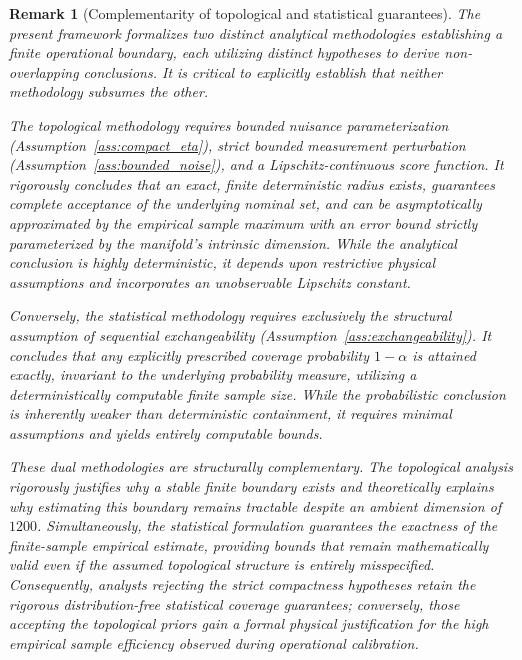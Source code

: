\documentclass[a4paper]{cas-sc}
\newtheorem{remark}{Remark}
\begin{document}
\begin{remark}[Complementarity of topological and statistical guarantees]
\label{rem:topology_vs_statistics}
The present framework formalizes two distinct analytical methodologies establishing a finite operational boundary, each utilizing distinct hypotheses to derive non-overlapping conclusions. It is critical to explicitly establish that neither methodology subsumes the other.

The topological methodology requires bounded nuisance parameterization (Assumption~\ref{ass:compact_eta}), strict bounded measurement perturbation (Assumption~\ref{ass:bounded_noise}), and a Lipschitz-continuous score function. It rigorously concludes that an exact, finite deterministic radius exists, guarantees complete acceptance of the underlying nominal set, and can be asymptotically approximated by the empirical sample maximum with an error bound strictly parameterized by the manifold's intrinsic dimension. While the analytical conclusion is highly deterministic, it depends upon restrictive physical assumptions and incorporates an unobservable Lipschitz constant.

Conversely, the statistical methodology requires exclusively the structural assumption of sequential exchangeability (Assumption~\ref{ass:exchangeability}). It concludes that any explicitly prescribed coverage probability \(1-\alpha\) is attained exactly, invariant to the underlying probability measure, utilizing a deterministically computable finite sample size. While the probabilistic conclusion is inherently weaker than deterministic containment, it requires minimal assumptions and yields entirely computable bounds.

These dual methodologies are structurally complementary. The topological analysis rigorously justifies \emph{why} a stable finite boundary exists and theoretically explains why estimating this boundary remains tractable despite an ambient dimension of \(1200\). Simultaneously, the statistical formulation guarantees the exactness of the finite-sample empirical estimate, providing bounds that remain mathematically valid even if the assumed topological structure is entirely misspecified. Consequently, analysts rejecting the strict compactness hypotheses retain the rigorous distribution-free statistical coverage guarantees; conversely, those accepting the topological priors gain a formal physical justification for the high empirical sample efficiency observed during operational calibration.
\end{remark}
\end{document}
